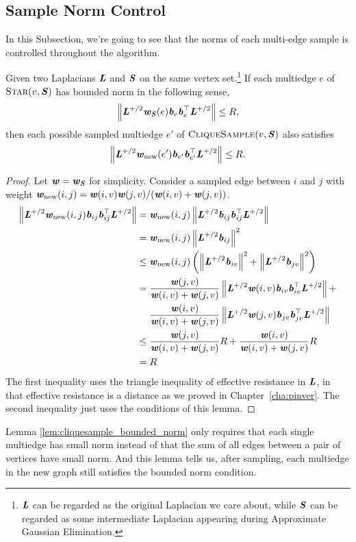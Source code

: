 \subsection{Sample Norm Control}
In this Subsection, we're going to see that the norms of each
multi-edge sample is controlled throughout the algorithm.
\begin{lemma}\label{lem:cliquesample_bounded_norm}
  Given two Laplacians $\LL$ and $\SS$ on the same vertex
  set.\footnote{$\LL$ can be regarded as the original Laplacian we
    care about, while $\SS$ can be regarded as some intermediate
    Laplacian appearing during Approximate Gaussian Elimination.} If
  each multiedge $e$ of $\vstar{v}{\SS}$ has bounded norm in the following sense,
  \[ \norm{\LL^{\pinv/2}\ww_{\SS}(e)\bb_e\bb_e^{\trp}\LL^{\pinv/2}} \leq R, \]
  then each possible sampled multiedge $e'$ of $\vcliqsp{v}{\SS}$ also satisfies
  \[ \norm{\LL^{\pinv/2}\ww_{\mathrm{new}}(e')\bb_{e'}\bb_{e'}^{\trp}\LL^{\pinv/2}} \leq R. \]
\end{lemma}
\begin{proof}
  Let $\ww=\ww_{\SS}$ for simplicity. Consider a sampled edge between $i$ and $j$ with weight $\ww_{\mathrm{new}}(i,j) = \ww(i,v)\ww(j,v)/(\ww(i,v)+\ww(j,v))$.
  \begin{align*}
    \norm{\LL^{\pinv/2} \ww_{\mathrm{new}}(i,j) \bb_{ij}\bb_{ij}^{\trp}\LL^{\pinv/2}}
    &= \ww_{\mathrm{new}}(i,j) \norm{\LL^{\pinv/2} \bb_{ij}\bb_{ij}^{\trp}\LL^{\pinv/2}} \\
    &= \ww_{\mathrm{new}}(i,j) \norm{ \LL^{\pinv/2}\bb_{ij} }^2 \\
    &\leq \ww_{\mathrm{new}}(i,j) \left( \norm{\LL^{\pinv/2}\bb_{iv}}^2 + \norm{\LL^{\pinv/2}\bb_{jv}}^2 \right) \\
    &= \frac{\ww(j,v)}{\ww(i,v)+\ww(j,v)} \norm{\LL^{\pinv/2} \ww(i,v)\bb_{iv}\bb_{iv}^{\trp}\LL^{\pinv/2}} + \\
    & ~\quad \frac{\ww(i,v)}{\ww(i,v)+\ww(j,v)} \norm{\LL^{\pinv/2} \ww(j,v)\bb_{jv}\bb_{jv}^{\trp}\LL^{\pinv/2}} \\
    &\leq \frac{\ww(j,v)}{\ww(i,v)+\ww(j,v)} R + \frac{\ww(i,v)}{\ww(i,v)+\ww(j,v)} R \\
    &= R
  \end{align*}
  The first inequality uses the triangle inequality of effective
  resistance in $\LL$, in that effective resistance is a distance as
  we proved in Chapter~\ref{cha:pinver}. The second inequality just uses the conditions of this lemma.
\end{proof}
\begin{remark}
  Lemma \ref{lem:cliquesample_bounded_norm} only requires that each single multiedge has small norm instead of that the sum of all edges between a pair of vertices have small norm. And this lemma tells us, after sampling, each multiedge in the new graph still satisfies the bounded norm condition.
\end{remark}
